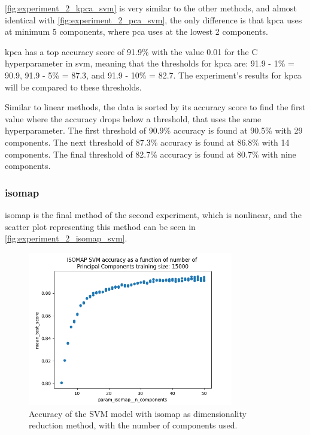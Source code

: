 \autoref{fig:experiment_2_kpca_svm} is very similar to the other methods, and almost identical with \autoref{fig:experiment_2_pca_svm}, the only difference is that \gls{kpca} uses at minimum 5 components, where \gls{pca} uses at the lowest 2 components.

\gls{kpca} has a top accuracy score of 91.9\% with the value 0.01 for the C hyperparameter in \gls{svm}, meaning that the thresholds for \gls{kpca} are: 91.9 - 1\% = 90.9, 91.9 - 5\% = 87.3, and 91.9 - 10\% = 82.7. The experiment's results for \gls{kpca} will be compared to these thresholds.

Similar to linear methods, the data is sorted by its accuracy score to find the first value where the accuracy drops below a threshold, that uses the same hyperparameter. The first threshold of 90.9\% accuracy is found at 90.5\% with 29 components. The next threshold of 87.3\% accuracy is found at 86.8\% with 14 components. The final threshold of 82.7\% accuracy is found at 80.7\% with nine components.


\subsubsection{\gls{isomap}}\label{subsubsec:experiment_2_isomap}
\gls{isomap} is the final method of the second experiment, which is nonlinear, and the scatter plot representing this method can be seen in \autoref{fig:experiment_2_isomap_svm}.

\begin{figure}[htb!]
    \centering
    \includegraphics[width=0.8\textwidth]{figures/experiment_two/isomap_rerun_svm_15000.png}
    \caption{Accuracy of the SVM model with \gls{isomap} as dimensionality reduction method, with the number of components used.}
    \label{fig:experiment_2_isomap_svm}
\end{figure}

